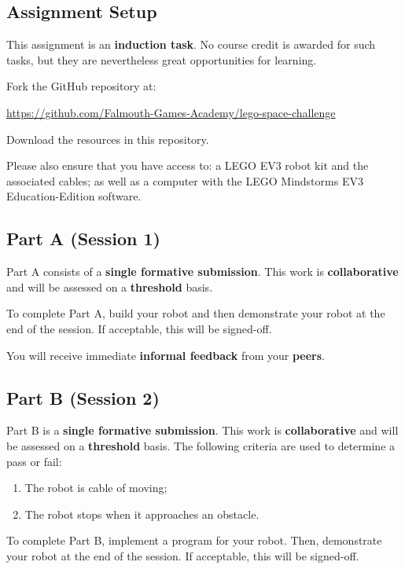\documentclass{fal_assignment}
\begin{document}
\subsection*{Assignment Setup}

This assignment is an \textbf{induction task}. No course credit is awarded for such tasks, but they are nevertheless great opportunities for learning.

Fork the GitHub repository at:

\indent \url{https://github.com/Falmouth-Games-Academy/lego-space-challenge}

Download the resources in this repository.

Please also ensure that you have access to: a LEGO EV3 robot kit and the associated cables; as well as a computer with the LEGO Mindstorms EV3 Education-Edition software. 

\subsection*{Part A (Session 1)}

Part A consists of a \textbf{single formative submission}. This work is \textbf{collaborative} and will be assessed on a \textbf{threshold} basis. 

To complete Part A, build your robot and then demonstrate your robot at the end of the session.  If acceptable, this will be signed-off. 

You will receive immediate \textbf{informal feedback} from your \textbf{peers}.

\subsection*{Part B (Session 2)}

Part B is a \textbf{single formative submission}. This work is \textbf{collaborative} and will be assessed on a \textbf{threshold} basis. The following criteria are used to determine a pass or fail:

\begin{enumerate}[label=(\alph*)]
	\item The robot is cable of moving;
	\item The robot stops when it approaches an obstacle.
\end{enumerate}

To complete Part B, implement a program for your robot. Then, demonstrate your robot at the end of the session.  If acceptable, this will be signed-off.
\end{document}
